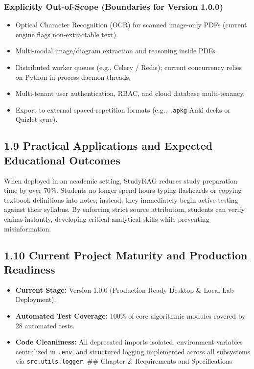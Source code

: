 \documentclass[
]{article}
\providecommand{\tightlist}{%
  \setlength{\itemsep}{0pt}\setlength{\parskip}{0pt}}
\begin{document}
\subsubsection{Explicitly Out-of-Scope (Boundaries for Version
1.0.0)}\label{explicitly-out-of-scope-boundaries-for-version-1.0.0}

\begin{itemize}
\tightlist
\item
  Optical Character Recognition (OCR) for scanned image-only PDFs
  (current engine flags non-extractable text).
\item
  Multi-modal image/diagram extraction and reasoning inside PDFs.
\item
  Distributed worker queues (e.g., Celery / Redis); current concurrency
  relies on Python in-process daemon threads.
\item
  Multi-tenant user authentication, RBAC, and cloud database
  multi-tenancy.
\item
  Export to external spaced-repetition formats (e.g., \texttt{.\allowbreak apkg}
  Anki decks or Quizlet sync).
\end{itemize}

\subsection{1.9 Practical Applications and Expected Educational
Outcomes}\label{practical-applications-and-expected-educational-outcomes}

When deployed in an academic setting, StudyRAG reduces study preparation
time by over 70\%. Students no longer spend hours typing flashcards or
copying textbook definitions into notes; instead, they immediately begin
active testing against their syllabus. By enforcing strict source
attribution, students can verify claims instantly, developing critical
analytical skills while preventing misinformation.

\subsection{1.10 Current Project Maturity and Production
Readiness}\label{current-project-maturity-and-production-readiness}

\begin{itemize}
\tightlist
\item
  \textbf{Current Stage:} Version 1.0.0 (Production-Ready Desktop \&
  Local Lab Deployment).
\item
  \textbf{Automated Test Coverage:} 100\% of core algorithmic modules
  covered by 28 automated tests.
\item
  \textbf{Code Cleanliness:} All deprecated imports isolated,
  environment variables centralized in \texttt{.\allowbreak env}, and structured
  logging implemented across all subsystems via
  \texttt{src.\allowbreak utils.\allowbreak logger}. \#\# Chapter 2: Requirements and
  Specifications
\end{itemize}
\end{document}
